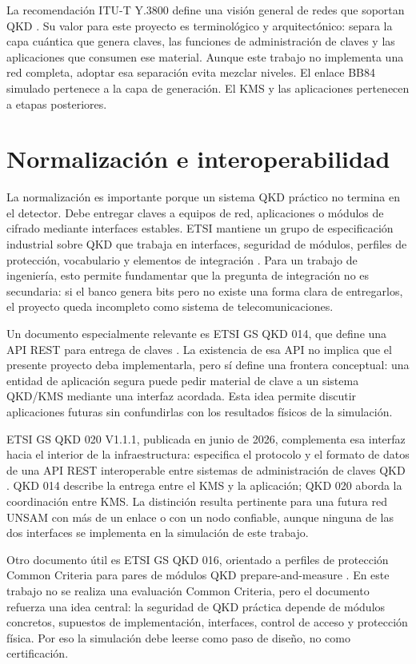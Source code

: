 La recomendación ITU-T Y.3800 define una visión general de redes que soportan QKD \cite{ituY3800}. Su valor para este proyecto es terminológico y arquitectónico: separa la capa cuántica que genera claves, las funciones de administración de claves y las aplicaciones que consumen ese material. Aunque este trabajo no implementa una red completa, adoptar esa separación evita mezclar niveles. El enlace BB84 simulado pertenece a la capa de generación. El KMS y las aplicaciones pertenecen a etapas posteriores.

\section{Normalización e interoperabilidad}

La normalización es importante porque un sistema QKD práctico no termina en el detector. Debe entregar claves a equipos de red, aplicaciones o módulos de cifrado mediante interfaces estables. ETSI mantiene un grupo de especificación industrial sobre QKD que trabaja en interfaces, seguridad de módulos, perfiles de protección, vocabulario y elementos de integración \cite{etsiISGQKD}. Para un trabajo de ingeniería, esto permite fundamentar que la pregunta de integración no es secundaria: si el banco genera bits pero no existe una forma clara de entregarlos, el proyecto queda incompleto como sistema de telecomunicaciones.

Un documento especialmente relevante es ETSI GS QKD 014, que define una API REST para entrega de claves \cite{etsiQKD014}. La existencia de esa API no implica que el presente proyecto deba implementarla, pero sí define una frontera conceptual: una entidad de aplicación segura puede pedir material de clave a un sistema QKD/KMS mediante una interfaz acordada. Esta idea permite discutir aplicaciones futuras sin confundirlas con los resultados físicos de la simulación.

ETSI GS QKD 020 V1.1.1, publicada en junio de 2026, complementa esa interfaz hacia el interior de la infraestructura: especifica el protocolo y el formato de datos de una API REST interoperable entre sistemas de administración de claves QKD \cite{etsiQKD020}. QKD 014 describe la entrega entre el KMS y la aplicación; QKD 020 aborda la coordinación entre KMS. La distinción resulta pertinente para una futura red UNSAM con más de un enlace o con un nodo confiable, aunque ninguna de las dos interfaces se implementa en la simulación de este trabajo.

Otro documento útil es ETSI GS QKD 016, orientado a perfiles de protección Common Criteria para pares de módulos QKD prepare-and-measure \cite{etsiQKD016}. En este trabajo no se realiza una evaluación Common Criteria, pero el documento refuerza una idea central: la seguridad de QKD práctica depende de módulos concretos, supuestos de implementación, interfaces, control de acceso y protección física. Por eso la simulación debe leerse como paso de diseño, no como certificación.

